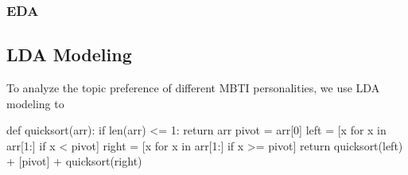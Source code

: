 \documentclass[12pt]{article}
\begin{document}
	\subsubsection{EDA}
	
	
	\subsection{LDA Modeling}
	To analyze the topic preference of different MBTI personalities, we use LDA modeling to 
	
	
	
	

	\begin{python}
def quicksort(arr):
if len(arr) <= 1:
return arr
pivot = arr[0]
left = [x for x in arr[1:] if x < pivot]
right = [x for x in arr[1:] if x >= pivot]
return quicksort(left) + [pivot] + quicksort(right)
	\end{python}
	
	



\printbibliography[title={References}]
\end{document}
